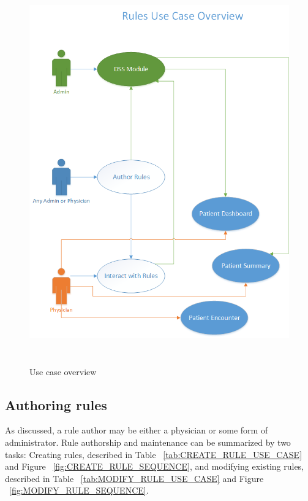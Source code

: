 \documentclass[12pt,letterpaper]{article}
\begin{document}
\begin{figure}\begin{center}
\includegraphics[height=6.5in]{use_case_overview.png}
\end{center}
\caption{Use case overview}
\label{fig:USE_CASE_OVERVIEW}
\end{figure}

\subsection{Authoring rules}

As discussed, a rule author may be either a physician or some 
form of administrator. Rule authorship and maintenance can be 
summarized by two tasks: Creating rules, described in 
Table ~\ref{tab:CREATE_RULE_USE_CASE} and 
Figure ~\ref{fig:CREATE_RULE_SEQUENCE},
and modifying existing rules, described in 
Table ~\ref{tab:MODIFY_RULE_USE_CASE} and 
Figure ~\ref{fig:MODIFY_RULE_SEQUENCE}.
\end{document}
